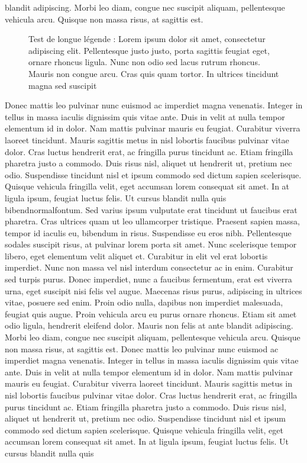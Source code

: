 \documentclass[letterpaper, twoside, 12pt,these,creativecommons,hyperref]{thETS}
\begin{document}
\begin{introduction}
blandit adipiscing. Morbi leo diam, congue nec suscipit aliquam, pellentesque vehicula arcu. Quisque non massa risus, at sagittis est.
\begin{figure}[ht]
	\centering
	\caption{Test de longue légende : Lorem ipsum dolor sit amet, consectetur adipiscing elit. Pellentesque justo justo, porta sagittis feugiat eget, ornare rhoncus ligula. Nunc non odio sed lacus rutrum rhoncus. Mauris non congue arcu. Cras quis quam tortor. In ultrices tincidunt magna sed suscipit}
	\label{fig:logoets}
\end{figure}
Donec mattis leo pulvinar nunc euismod ac imperdiet magna venenatis. Integer in tellus in massa iaculis dignissim quis vitae ante. Duis in velit at nulla tempor elementum id in dolor. Nam mattis pulvinar mauris eu feugiat. Curabitur viverra laoreet tincidunt. Mauris sagittis metus in nisl lobortis faucibus pulvinar vitae dolor. Cras luctus hendrerit erat, ac fringilla purus tincidunt ac. Etiam fringilla pharetra justo a commodo. Duis risus nisl, aliquet ut hendrerit ut, pretium nec odio. Suspendisse tincidunt nisl et ipsum commodo sed dictum sapien scelerisque. Quisque vehicula fringilla velit, eget accumsan lorem consequat sit amet. In at ligula ipsum, feugiat luctus felis. Ut cursus blandit nulla quis bibendnormalfontum. Sed varius ipsum vulputate erat tincidunt ut faucibus erat pharetra. Cras ultrices quam ut leo ullamcorper tristique. Praesent sapien massa, tempor id iaculis eu, bibendum in risus. Suspendisse eu eros nibh. Pellentesque sodales suscipit risus, at pulvinar lorem porta sit amet. Nunc scelerisque tempor libero, eget elementum velit aliquet et. Curabitur in elit vel erat lobortis imperdiet. Nunc non massa vel nisl interdum consectetur ac in enim. Curabitur sed turpis purus. Donec imperdiet, nunc a faucibus fermentum, erat est viverra urna, eget suscipit nisi felis vel augue. Maecenas risus purus, adipiscing in ultrices vitae, posuere sed enim. Proin odio nulla, dapibus non imperdiet malesuada, feugiat quis augue. Proin vehicula arcu eu purus ornare rhoncus. Etiam sit amet odio ligula, hendrerit eleifend dolor. Mauris non felis at ante blandit adipiscing. Morbi leo diam, congue nec suscipit aliquam, pellentesque vehicula arcu. Quisque non massa risus, at sagittis est. Donec mattis leo pulvinar nunc euismod ac imperdiet magna venenatis. Integer in tellus in massa iaculis dignissim quis vitae ante. Duis in velit at nulla tempor elementum id in dolor. Nam mattis pulvinar mauris eu feugiat. Curabitur viverra laoreet tincidunt. Mauris sagittis metus in nisl lobortis faucibus pulvinar vitae dolor. Cras luctus hendrerit erat, ac fringilla purus tincidunt ac. Etiam fringilla pharetra justo a commodo. Duis risus nisl, aliquet ut hendrerit ut, pretium nec odio. Suspendisse tincidunt nisl et ipsum commodo sed dictum sapien scelerisque. Quisque vehicula fringilla velit, eget accumsan lorem consequat sit amet. In at ligula ipsum, feugiat luctus felis. Ut cursus blandit nulla quis 
\end{introduction}
\end{document}
